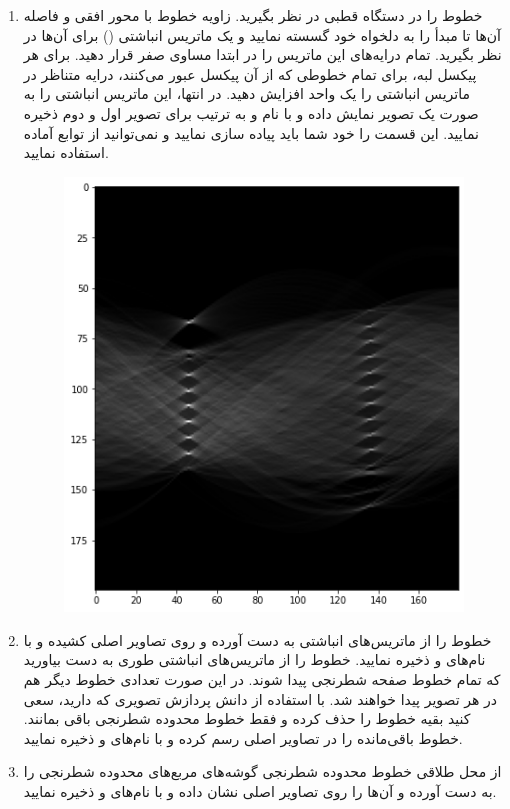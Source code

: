 \documentclass[a4paper]{article}
\begin{document}
\begin{enumerate}
\begin{figure}[H]
\begin{subfigure}{.49\textwidth}
			\caption{}
		\end{subfigure}
		\caption{}
	\end{figure}
	\item 
خطوط را در دستگاه قطبی در نظر بگیرید. زاویه خطوط با محور افقی و فاصله آن‌ها تا مبدأ را به دلخواه خود گسسته نمایید و یک ماتریس انباشتی 
	()
برای آن‌ها در نظر بگیرید. تمام درایه‌های این ماتریس را در ابتدا مساوی صفر قرار دهید. برای هر پیکسل لبه، برای تمام خطوطی که از آن پیکسل عبور می‌کنند، درایه متناظر در ماتریس انباشتی را یک واحد افزایش دهید. در انتها، این ماتریس انباشتی را به صورت یک تصویر نمایش داده و با نام 
  و
   به ترتیب برای تصویر اول و دوم ذخیره نمایید. این قسمت را خود شما باید پیاده سازی نمایید و نمی‌توانید از توابع آماده استفاده نمایید.
\begin{figure}[H]
	\centering
	\includegraphics[width=.4\linewidth]{accumulator}
	\caption{}
\end{figure}
\item 
خطوط را از ماتریس‌های انباشتی به دست آورده و روی تصاویر اصلی کشیده و با نام‌های
و
ذخیره نمایید. خطوط را از ماتریس‌های انباشتی طوری به دست بیاورید که تمام خطوط صفحه شطرنجی پیدا شوند. در این صورت تعدادی خطوط دیگر هم در هر تصویر پیدا خواهند شد. با استفاده از دانش پردازش تصویری که دارید، سعی کنید بقیه خطوط را حذف کرده و فقط خطوط محدوده شطرنجی باقی بمانند. خطوط باقی‌مانده را در تصاویر اصلی رسم کرده و با نام‌های
 و
 ذخیره نمایید.
 \item 
از محل طلاقی خطوط محدوده شطرنجی گوشه‌های مربع‌های محدوده شطرنجی را به دست آورده و آن‌ها را روی تصاویر اصلی نشان داده و با نام‌های  
و 
ذخیره نمایید.
\end{enumerate} 
\end{document}
